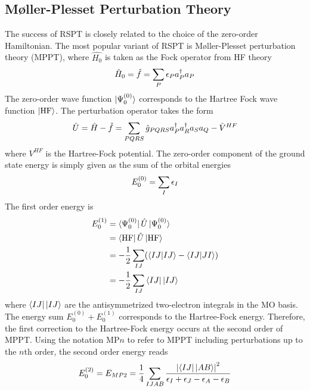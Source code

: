 \subsection{M{\o}ller-Plesset Perturbation Theory}

The success of RSPT is closely related to the choice of the zero-order Hamiltonian. The most popular variant of RSPT is M{\o}ller-Plesset perturbation theory (MPPT), where $\hat{H_0}$ is taken as the Fock operator from HF theory
\begin{equation}
\hat{H}_0 = \hat{f} = \sum_P \epsilon_P a^{\dagger}_P a_P
\end{equation}
\noindent The zero-order wave function $\ket{\smash{\Psi_0^{(0)}}}$ corresponds to the Hartree Fock wave function $\ket{\smash{\text{HF}}}$. The perturbation operator takes the form
\begin{equation}
\hat{U} = \hat{H} - \hat{f} = \sum_{PQRS} \hat{g}_{PQRS} a^{\dagger}_P a^{\dagger}_R a_S a_Q - \hat{V}^{HF} 
\end{equation}
\noindent where $V^{HF}$ is the Hartree-Fock potential. The zero-order component of the ground state energy is simply given as the sum of the orbital energies
\begin{equation}
E_0^{(0)} = \sum_I \epsilon_I
\end{equation}
\noindent The first order energy is
\begin{equation}
\begin{split}
E_0^{(1)} &= \sbra{\Psi_0^{(0)}} \hat{U} \sket{\Psi_0^{(0)}} \\
&= \sbra{\HFWFN}\hat{U}\sket{\HFWFN} \\
&= -\frac{1}{2} \sum_{IJ} ( \sbraket{IJ}{IJ} - \sbraket{IJ}{JI} ) \\
&= -\frac{1}{2} \sum_{IJ} \sbra{IJ}\sket{IJ} 
\end{split}
\end{equation}
\noindent where $\sbra{IJ}\sket{IJ}$ are the antisymmetrized two-electron integrals in the MO basis. The energy sum $E_0^{(0)} + E_0^{(1)}$ corresponds to the Hartree-Fock energy. Therefore, the first correction to the Hartree-Fock energy occurs at the second order of MPPT. Using the notation MP$n$ to refer to MPPT including perturbations up to the $n$th order, the second order energy reads
\begin{equation}
\begin{split}
E_0^{(2)} = E_{MP2} = \frac{1}{4} \sum_{IJAB} \frac{\abs{ \sbra{IJ}\sket{AB}}^2}{\eps_I + \eps_J - \eps_A - \eps_B}
\end{split} 
\label{eq:UMP2}
\end{equation}
